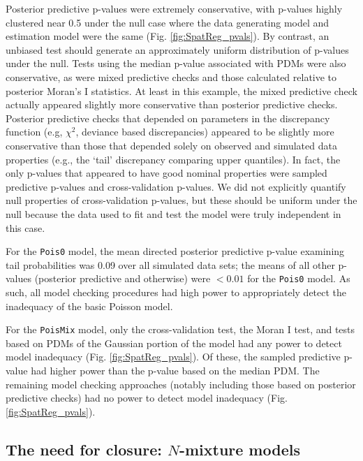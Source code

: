 \documentclass[12pt,english]{article}
\begin{document}
\begin{spacing}{1.9}
Posterior predictive p-values were extremely conservative, with
p-values highly clustered near 0.5 under the null case where the data
generating model and estimation model were the same
(Fig. \ref{fig:SpatReg_pvals}).  By contrast, an unbiased test should
generate an approximately uniform distribution of p-values under the
null.  Tests using the median p-value associated with PDMs were also
conservative, as were mixed predictive checks and those calculated
relative to posterior Moran's I statistics.  At least in this example,
the mixed predictive check actually appeared slightly
more conservative than posterior predictive checks.
Posterior predictive checks that depended on parameters in the
discrepancy function (e.g, $\chi^2$, deviance based discrepancies)
appeared to be slightly more conservative than those that depended
solely on observed and simulated data properties (e.g., the `tail'
discrepancy comparing upper quantiles).  In fact, the only p-values
that appeared to have good nominal properties were sampled predictive
p-values and cross-validation p-values.  We did not explicitly
quantify null properties of cross-validation p-values, but these
should be uniform under the null because the data used to fit and test
the model were truly independent in this case.

For the \texttt{Pois0} model, the mean directed posterior predictive
p-value examining tail probabilities was 0.09 over all simulated data
sets; the means of all other p-values (posterior predictive and
otherwise) were $<0.01$ for the \texttt{Pois0} model.  As such, all
model checking procedures had high power to appropriately detect the
inadequacy of the basic Poisson model.

For the \texttt{PoisMix} model, only the cross-validation test, the
Moran I test, and tests based on PDMs of the Gaussian portion of the
model had any power to detect model inadequacy
(Fig. \ref{fig:SpatReg_pvals}).  Of these, the sampled predictive
p-value had higher power than the p-value based on the median PDM.
The remaining model checking approaches (notably including those based
on posterior predictive checks) had no power to detect model
inadequacy (Fig. \ref{fig:SpatReg_pvals}).



\subsection{The need for closure: $N$-mixture models}


\end{spacing}
\end{document}
